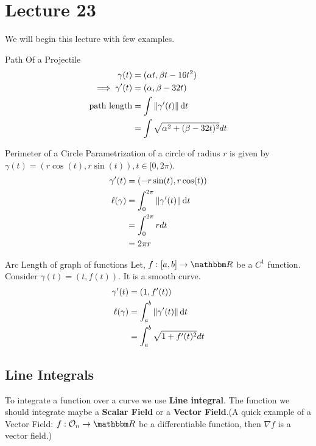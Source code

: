 \documentclass[../Analysis-3]{subfiles}
\begin{document}
\chapter*{Lecture 23} %
\setcounter{chapter}{23} %
\setcounter{section}{0}

We will begin this lecture with few examples.
\begin{Eg}{Path Of a Projectile}{}
    \begin{align*}
        \gamma(t)           & =(\alpha t, \beta t-16t^2)               \\
        \implies \gamma'(t) & = (\alpha, \beta -32t)                   \\
        \text{path length}  & = \int \norm{\gamma'(t)}\dd{t}           \\
                            & = \int \sqrt{\alpha^2 +(\beta-32t)^2} dt
    \end{align*}
\end{Eg}

\begin{Eg}{Perimeter of a Circle}{}
    Parametrization of a circle of radius $r$ is given by $\gamma(t) = (r\cos(t),r\sin(t)), t \in [0,2\pi)$.
    \begin{align*}
        \gamma'(t)    & = (-r\sin(t),r\cos(t))                    \\
        \ell (\gamma) & = \int_{0}^{2\pi} \norm{\gamma'(t)}\dd{t} \\
                      & = \int_{0}^{2\pi} r dt                    \\
                      & = 2\pi r
    \end{align*}
\end{Eg}

\begin{Eg}{Arc Length of graph of functions}{}
    Let, $f : [a,b]\to \R$ be a $C^1$ function. Consider $\gamma(t)=(t, f(t))$. It is a smooth curve.
    \begin{align*}
        \gamma'(t)    & = (1,f'(t))                            \\
        \ell (\gamma) & = \int_{a}^{b} \norm{\gamma'(t)}\dd{t} \\
                      & = \int_{a}^{b} \sqrt{1 + f'(t)^2} dt
    \end{align*}
\end{Eg}

\section{Line Integrals}
To integrate a function over a curve we use \textbf{Line integral}. The function we should integrate maybe a \textbf{Scalar Field} or a \textbf{Vector Field}.(A quick example of a Vector Field: $f : \Op{n} \to \R$ be a differentiable function, then $\nabla f$ is a vector field.)
\end{document}
